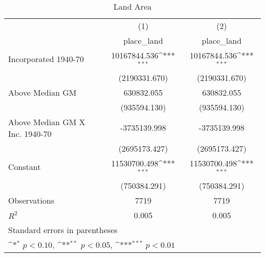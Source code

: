 \begin{table}[htbp]\centering
\def\sym#1{\ifmmode^{#1}\else\(^{#1}\)\fi}
\caption{Land Area}
\begin{tabular}{l*{2}{c}}
\hline\hline
                    &\multicolumn{1}{c}{(1)}&\multicolumn{1}{c}{(2)}\\
                    &\multicolumn{1}{c}{place\_land}&\multicolumn{1}{c}{place\_land}\\
\hline
Incorporated 1940-70&10167844.536\sym{***}&10167844.536\sym{***}\\
                    &(2190331.670)         &(2190331.670)         \\
[1em]
Above Median GM     &  630832.055         &  630832.055         \\
                    &(935594.130)         &(935594.130)         \\
[1em]
Above Median GM X Inc. 1940-70&-3735139.998         &-3735139.998         \\
                    &(2695173.427)         &(2695173.427)         \\
[1em]
Constant            &11530700.498\sym{***}&11530700.498\sym{***}\\
                    &(750384.291)         &(750384.291)         \\
\hline
Observations        &        7719         &        7719         \\
\(R^{2}\)           &       0.005         &       0.005         \\
\hline\hline
\multicolumn{3}{l}{\footnotesize Standard errors in parentheses}\\
\multicolumn{3}{l}{\footnotesize \sym{*} \(p<0.10\), \sym{**} \(p<0.05\), \sym{***} \(p<0.01\)}\\
\end{tabular}
\end{table}
